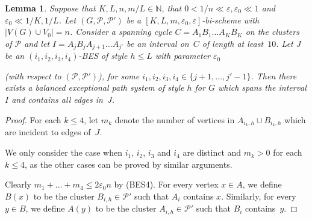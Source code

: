 \documentclass{memo-l}
\newtheorem{lemma}[firstthm]{Lemma}
\def\COMMENT#1{}
\def\cP{\mathcal{P}}
\def\eps{\varepsilon}
\def\epszero{\eps_0}
\numberwithin{section}{chapter}
\numberwithin{equation}{section}
\numberwithin{firstthm}{section}
\numberwithin{figure}{section}
\begin{document}
{\begin{lemma} \label{lma:bipartite:CEPS}
Suppose that $K, L, n, m/L \in \mathbb{N}$, that $0 <1/n  \ll \eps, \eps_0\ll 1$ and $\eps_0\ll 1/K,1/L$.
Let $(G,\mathcal{P}, \mathcal{P}')$ be a $[K, L, m,\eps_0,\eps]$-bi-scheme with $|V(G)\cup V_0|=n$.
Consider a spanning cycle $C = A_1 B_1 \dots A_K B_K$ on the clusters of $\mathcal{P}$ and let 
$I  = A_j B_j A_{j+1} \dots  A_{j'}$ be an interval on~$C$ of length at least~$10$.
Let $J$ be an $(i_1, i_2 , i_3 , i_4)$-BES of style $h\le L$ with parameter $\eps_0$%
    \COMMENT{We use $\eps_0$ for both the $(K,m, \epszero)$-partition $\cP'$ and the bound on $e(J)$. But this seems
to be ok for our applications. Also, can probably replace the 10 for the interval length by something smaller, but 10 seems safe.}
(with respect to $(\cP,\cP')$), for some $i_1, i_2, i_3 , i_4 \in \{j+1, \dots, j'-1\}$.
Then there exists a balanced exceptional path system of style $h$ for $G$
which spans the interval $I$ and contains all edges in~$J$.
\end{lemma}
\begin{proof}
For each $k\le 4$, let $m_k$ denote the number of vertices in $A_{i_k,h} \cup B_{i_k,h}$ which are incident to edges of~$J$.%
     \COMMENT{Cannot just write $m_k := |V(J) \cap (A_{i_k,h} \cup B_{i_k,h})|$ since $V(J)$ contains vertices of degree zero.}
We only consider the case when $i_1$, $i_2$, $i_3$ and $i_4$ are distinct and $m_k>0$ for each $k \le 4$, as the other cases can be
proved by similar arguments.%
\COMMENT{The argument is essentially identical in the other cases. Only now, we don't consider 
$m_1,\dots, m_4$ but a subset of them. For example, consider the case when
$i_1,\dots, i_4$ are all distinct except $i_3=i_4$ and each $m_i >0$. Then note that
$m_3=m_4$. So we now follow the argument as before but only use $m_1,m_2,m_3$.
So for example, we now have
\begin{align*}
	 |V(P^*_{1,{\rm dir}}) \cap A_{i,h}| &= 
	 \begin{cases}
	1	& \textrm{for $i \in \{j, \dots, j'\} \setminus \{i_1, i_2, i_3 \}$,}\\
	m_k	& \textrm{for $i = i_k$ and $k \le 3$,}\\
	0	& \textrm{otherwise.}
	 \end{cases}
\end{align*}
Further, now for each $k \le 3$, we choose $m_k-1$ paths $P_1^{k}, \dots, P_{m_{k}-1}^{k}$ in $G$. So now $Q$ is a path system consisting of $m_1+m_2+m_3 - 2 $ vertex-disjoint directed paths from $A_{j,h}$ to $A_{j',h}$.
\\
In cases where one of the $m_i=0$, we similarly `ignore' $m_i$ and follow the corresponding
calculations. } 
Clearly $m_1+\dots+m_4 \le  2\epszero n$ by (BES4).
For every vertex $x \in A$, we define $B(x)$ to be the cluster $B_{i,h}\in\mathcal{P}'$ such that $A_i$ contains $x$.
Similarly, for every $y \in B$, we define $A(y)$ to be the cluster $A_{i,h}\in\mathcal{P}'$ such that $B_i$ contains~$y$.%
     \COMMENT{Daniela replaced $\mathcal{P}$ by $\mathcal{P}'$ (twice)}


\end{proof}}
\end{document}
